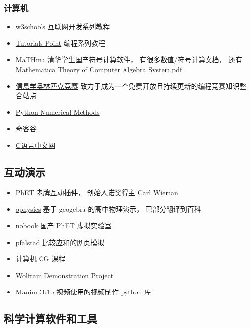 \subsubsection{计算机}
\begin{itemize}
\item \href{https://www.w3schools.com/}{w3schools} 互联网开发系列教程
\item \href{https://www.tutorialspoint.com/index.htm}{Tutorials Point} 编程系列教程
\item \href{http://mathmu.github.io/MTCAS/RecentChanges.html}{MaTHmu} 清华学生国产符号计算软件， 有很多数值/符号计算文档， 还有 \href{https://github.com/maTHmU/MTCAS}{Mathematica Theory of Computer Algebra System.pdf}
\item \href{https://oi-wiki.org/}{信息学奥林匹克竞赛} 致力于成为一个免费开放且持续更新的编程竞赛知识整合站点
\item \href{https://pythonnumericalmethods.berkeley.edu/notebooks/Index.html}{Python Numerical Methods}
\item \href{https://www.qikegu.com/}{奇客谷}
\item \href{http://c.biancheng.net/}{C语言中文网}
\end{itemize}

\subsection{互动演示}
\begin{itemize}
\item \href{https://phet.colorado.edu/}{PhET} 老牌互动插件， 创始人诺奖得主 Carl Wieman
\item \href{https://ophysics.com/}{ophysics} 基于 geogebra 的高中物理演示， 已部分翻译到百科
\item \href{https://www.nobook.com/}{nobook} 国产 PhET 虚拟实验室
\item \href{https://www.falstad.com/}{pfalstad} 比较应和的网页模拟
\item \href{http://www.cs.cornell.edu/courses/cs5643/2010sp/}{计算机 CG 课程}
\item \href{https://demonstrations.wolfram.com/topics.php?PhysicalSciences#5}{Wolfram Demonstration Project}
\item \href{https://github.com/3b1b/manim}{Manim} 3b1b 视频使用的视频制作 python 库
\end{itemize}

\subsection{科学计算软件和工具}
